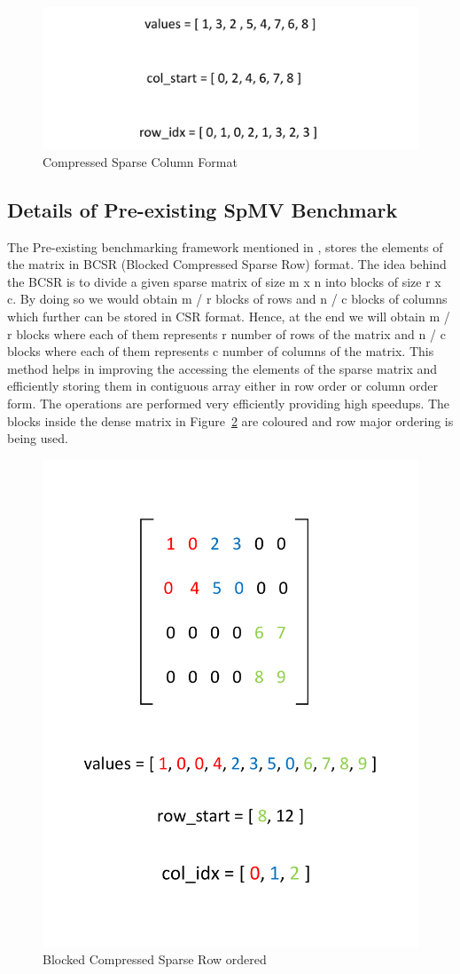 \begin{figure}
	\centering
	\includegraphics[width=.6\textwidth]{images/csc.pdf}
	\caption{Compressed Sparse Column Format}
	\label{aaa:1000}
\end{figure}

\subsection{Details of Pre-existing SpMV Benchmark}

The Pre-existing benchmarking framework mentioned in \cite{25}, stores the elements of the matrix in BCSR (Blocked Compressed Sparse Row) format. The idea behind the BCSR is to divide a given sparse matrix of size m x n into blocks of size r x c. By doing so we would obtain m / r blocks of rows and n / c blocks of columns which further can be stored in CSR format. Hence, at the end we will obtain m / r blocks where each of them represents r number of rows of the matrix and n / c blocks where each of them represents c number of columns of the matrix. This method helps in improving the accessing the elements of the sparse matrix and efficiently storing them in contiguous array either in row order or column order form. The operations are performed very efficiently providing high speedups. The blocks inside the dense matrix in Figure~\ref{aaaa:10000} are coloured and row major ordering is being used.  


\begin{figure}
	\centering
	\includegraphics[width=.6\textwidth]{images/bcr.pdf}
	\caption{Blocked Compressed Sparse Row ordered}
	\label{aaaa:10000}
\end{figure}

